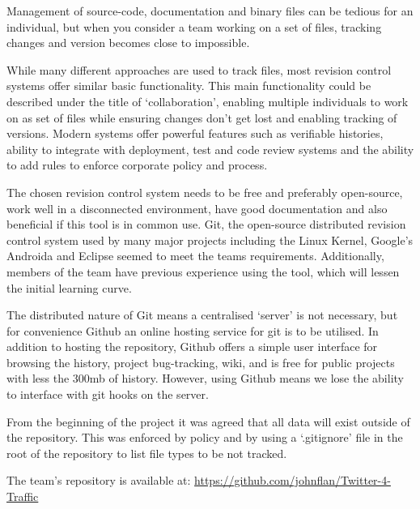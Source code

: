 Management of source-code, documentation and binary files can be tedious for an individual, but when you consider a team working on a set of files, tracking changes and version becomes close to impossible.

While many different approaches are used to track files, most revision control systems offer
similar basic functionality. This main functionality could be described under
the title of ‘collaboration’, enabling multiple individuals to work on as set of
files while ensuring changes don’t get lost and enabling tracking of versions.
Modern systems offer powerful features such as verifiable histories, ability to integrate with deployment, test and code review systems and the ability to add rules to enforce corporate policy and process.

The chosen revision control system needs to be free and preferably open-source,
work well in a disconnected environment, have good documentation and also
beneficial if this tool is in common use. Git\cite{website:git_scm}, the
open-source distributed revision control system used by many major projects
including the Linux Kernel, Google’s Androida and Eclipse seemed to meet the
teams requirements. Additionally, members of the team have previous experience using the tool, which will lessen the initial learning curve.

The distributed nature of Git means a centralised ‘server’ is not necessary,
but for convenience Github\cite{website:github} an online hosting service for
git is to be utilised. In addition to hosting the repository, Github offers a
simple user interface for browsing the history, project bug-tracking, wiki, and
is free for public projects with less the 300mb of history. However, using
Github means we lose the ability to interface with git hooks on the server. 

From the beginning of the project it was agreed that all data will exist
outside of the repository. This was enforced by policy and by using a ‘.gitignore’ file in the root of the repository to list file types to be not tracked.  

The team’s repository is available at: \url{https://github.com/johnflan/Twitter-4-Traffic}
\pagebreak 
